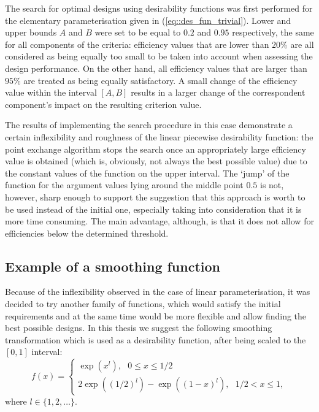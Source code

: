 The search for optimal designs using desirability functions was first performed for the elementary parameterisation given in (\ref{eq::des_fun_trivial}). Lower and upper bounds $A$ and $B$ were set to be equal to $0.2$ and $0.95$ respectively, the same for all components of the criteria: efficiency values that are lower than $20\%$ are all considered as being equally too small to be taken into account when assessing the design performance. On the other hand, all efficiency values that are larger than $95\%$ are treated as being equally satisfactory. A small change of the efficiency value within the interval $[A,B]$ results in a larger change of the correspondent component's impact on the resulting criterion value. 
 
The results of implementing the search procedure in this case demonstrate a certain inflexibility and  roughness of the linear piecewise desirability function: the point exchange algorithm stops the search once an appropriately large efficiency value is obtained (which is, obviously, not always the best possible value) due to the constant values of the function on the upper interval. The `jump' of the function for the argument values lying around the middle point $0.5$ is not, however, sharp enough to  support the suggestion that this approach is worth to be used instead of the initial one, especially taking into consideration that it is more time consuming. The main advantage, although, is that it does not allow for efficiencies below the determined threshold.

\subsection{Example of a smoothing function}
Because of the inflexibility observed in the case of linear parameterisation, it was decided to try another family of functions, which would satisfy the initial requirements and at the same time would be more flexible and allow finding the best possible designs. In this thesis we suggest the following smoothing transformation which is used as a desirability function, after being scaled to the $[0,1]$ interval: 
\begin{equation}
\label{eq::des_fun_exp}
f(x)=
\begin{cases}      
\exp(x^l),\mbox{                     } 0\leq x \leq 1/2\\
2\exp((1/2)^l)-\exp((1-x)^l),\mbox{  } 1/2 < x\leq 1, 
\end{cases}
\end{equation}
where $l\in\{1,2,\ldots \}.$

